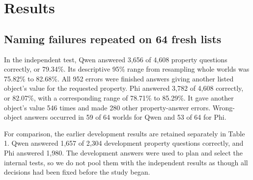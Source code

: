 \documentclass[10pt,letterpaper]{article}
\begin{document}
\section*{Results}

\subsection*{Naming failures repeated on 64 fresh lists}

In the independent test, Qwen answered 3,656 of 4,608 property questions correctly, or 79.34\%. Its descriptive 95\% range from resampling whole worlds was 75.82\% to 82.68\%. All 952 errors were finished answers giving another listed object's value for the requested property. Phi answered 3,782 of 4,608 correctly, or 82.07\%, with a corresponding range of 78.71\% to 85.29\%. It gave another object's value 546 times and made 280 other property-answer errors. Wrong-object answers occurred in 59 of 64 worlds for Qwen and 53 of 64 for Phi.


For comparison, the earlier development results are retained separately in Table 1. Qwen answered 1,657 of 2,304 development property questions correctly, and Phi answered 1,980. The development answers were used to plan and select the internal tests, so we do not pool them with the independent results as though all decisions had been fixed before the study began.
\end{document}

